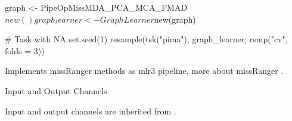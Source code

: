 \documentclass[letterpaper]{book}
\begin{document}
%
\begin{Examples}
\begin{ExampleCode}
{
  graph <- PipeOpMissMDA_PCA_MCA_FMAD$new() %
  graph_learner <- GraphLearner$new(graph)

  # Task with NA
  set.seed(1)
  resample(tsk("pima"), graph_learner, rsmp("cv", folds = 3))
}
\end{ExampleCode}
\end{Examples}
%
\begin{Description}\relax
Implements missRanger methods as mlr3 pipeline, more about missRanger .
\end{Description}
%
\begin{Section}{Input and Output Channels}

Input and output channels are inherited from .
\end{Section}
%
\end{document}
